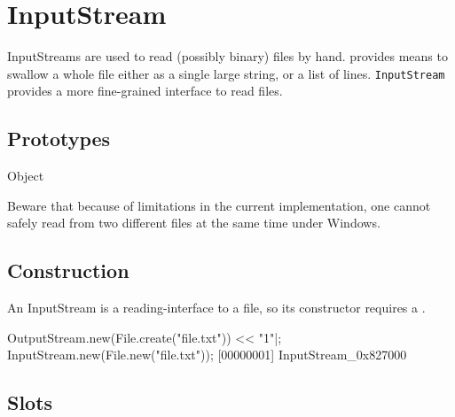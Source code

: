 
\section{InputStream}

InputStreams are used to read (possibly binary) files by hand.
 provides means to swallow a whole file either as a
single large string, or a list of lines.  \lstinline|InputStream|
provides a more fine-grained interface to read files.

\subsection{Prototypes}
\begin{refObjects}
\item[Object]
\end{refObjects}

\begin{windows}
  Beware that because of limitations in the current implementation,
  one cannot safely read from two different files at the same time
  under Windows.
\end{windows}

\subsection{Construction}

An InputStream is a reading-interface to a file, so its constructor
requires a .

\begin{urbiscript}[firstnumber=1]
OutputStream.new(File.create("file.txt")) << "1\n"|;
InputStream.new(File.new("file.txt"));
[00000001] InputStream_0x827000
\end{urbiscript}

\subsection{Slots}

